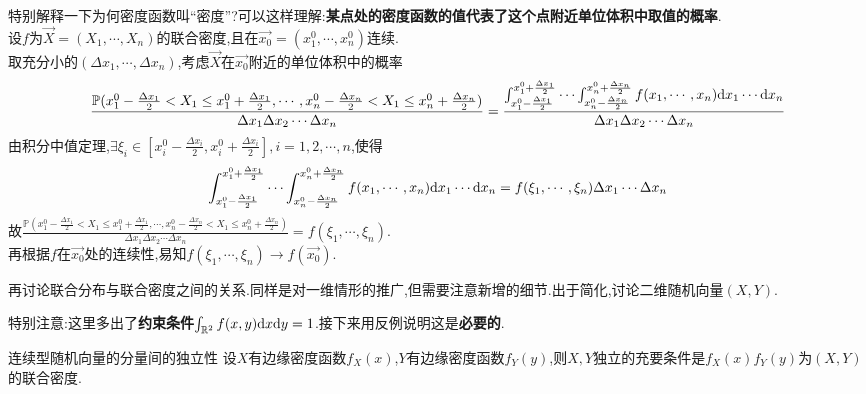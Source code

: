 特别解释一下为何密度函数叫“密度”?可以这样理解:\textbf{某点处的密度函数的值代表了这个点附近单位体积中取值的概率}.\\
设$f$为$\overrightarrow{X}=(X_1,\cdots,X_n)$的联合密度,且在$\overrightarrow{x_0}=(x_1^0,\cdots,x_n^0)$连续.\\
取充分小的$(\Delta x_1,\cdots,\Delta x_n)$,考虑$\overrightarrow{X}$在$\overrightarrow{x_0}$附近的单位体积中的概率
$$\frac{\mathbb{P}(x^0_1-\frac{\Delta x_1}{2}<X_1\leq x^0_1+\frac{\Delta x_1}{2},\cdots,x^0_n-\frac{\Delta x_n}{2}<X_1\leq x^0_n+\frac{\Delta x_n}{2})}{\Delta x_1\Delta x_2\cdots\Delta x_n}
=\frac{\int_{x_1^0-\frac{\Delta x_1}{2}}^{x_1^0+\frac{\Delta x_1}{2}}\cdots\int_{x_n^0-\frac{\Delta x_n}{2}}^{x_n^0+\frac{\Delta x_n}{2}}f(x_1,\cdots,x_n){\rm d}x_1\cdots{\rm d}x_n}{\Delta x_1\Delta x_2\cdots\Delta x_n}$$
由积分中值定理,$\exists \xi_i\in \left[x_i^0-\frac{\Delta x_i}{2},x_i^0+\frac{\Delta x_i}{2}\right],i=1,2,\cdots,n$,使得
$$\int_{x_1^0-\frac{\Delta x_1}{2}}^{x_1^0+\frac{\Delta x_1}{2}}\cdots\int_{x_n^0-\frac{\Delta x_n}{2}}^{x_n^0+\frac{\Delta x_n}{2}}f(x_1,\cdots,x_n){\rm d}x_1\cdots{\rm d}x_n=f(\xi_1,\cdots,\xi_n)\Delta x_1\cdots\Delta x_n$$
故$\frac{\mathbb{P}(x^0_1-\frac{\Delta x_1}{2}<X_1\leq x^0_1+\frac{\Delta x_1}{2},\cdots,x^0_n-\frac{\Delta x_n}{2}<X_1\leq x^0_n+\frac{\Delta x_n}{2})}{\Delta x_1\Delta x_2\cdots\Delta x_n}=f(\xi_1,\cdots,\xi_n)$.
\\再根据$f$在$\overrightarrow{x_0}$处的连续性,易知$f(\xi_1,\cdots,\xi_n)\to f(\overrightarrow{x_0})$.

再讨论联合分布与联合密度之间的关系.同样是对一维情形的推广,但需要注意新增的细节.出于简化,讨论二维随机向量$(X,Y)$.

特别注意:这里多出了\textbf{约束条件}$\int_{\mathbb{R}^2}f(x,y){\rm d}x{\rm d}y=1$.接下来用反例说明这是\textbf{必要的}.

\begin{example}
\end{example}

\begin{theorem}{连续型随机向量的分量间的独立性}{}
    设$X$有边缘密度函数$f_X(x)$,$Y$有边缘密度函数$f_Y(y)$,则$X,Y$独立的充要条件是$f_X(x)f_Y(y)$为$(X,Y)$的联合密度.
\end{theorem}